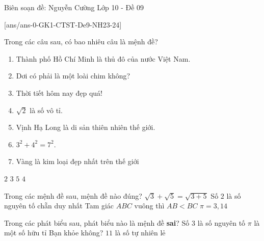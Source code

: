\begin{name}
	{Biên soạn đề: Nguyễn Cường}
	{Lớp 10 - Đề 09} 
\end{name}
[ans/ans-0-GK1-CTST-De9-NH23-24]
\begin{ex}%
	Trong các câu sau, có bao nhiêu câu là mệnh đề?
\begin{multicols}{2}
		\begin{enumerate}
		\item Thành phố Hồ Chí Minh là thủ đô của nước Việt Nam.
		\item Dơi có phải là một loài chim không?
		\item Thời tiết hôm nay đẹp quá!
		\item $\sqrt{2}$ là số vô tỉ.
		\item Vịnh Hạ Long là di sản thiên nhiên thế giới.
		\item $3^2+4^2=7^2$.
		\item Vàng là kim loại đẹp nhất trên thế giới
	\end{enumerate}
\end{multicols}
	\choice
	{$2$}
	{$3$}
	{$5$}
	{\True $4$}
\end{ex}
\begin{ex}%
	Trong các mệnh đề sau, mệnh đề nào đúng?
	\choice
	{$\sqrt{3}+\sqrt{5}=\sqrt{3+5}$}
	{\True Số $2$ là số nguyên tố chẵn duy nhất}
	{Tam giác $ABC$ vuông thì $AB<BC$}
	{$\pi=3{,}14$}
\end{ex}
\begin{ex}%
	Trong các phát biểu sau, phát biểu nào là mệnh đề \textbf{sai}?
	\choice
	{Số $3$ là số nguyên tố}
	{\True $\pi$ là một số hữu tỉ}
	{Bạn khỏe không?}
	{$11$ là số tự nhiên lẻ}
\end{ex}
